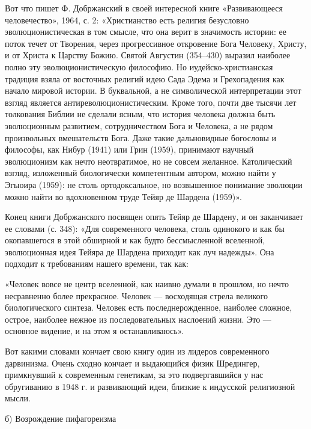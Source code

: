 Вот что пишет  Ф. Добржанский в своей  интересной книге «Развивающееся
человечество»,  1964,  с.  2: «Христианство  есть  религия  безусловно
эволюционистическая в том смысле, что  она верит в значимость истории:
ее  поток  течет  от  Творения, через  прогрессивное  откровение  Бога
Человеку,  Христу,  и  от  Христа к  Царству  Божию.  Святой  Августин
(354--430) выразил  наиболее полно эту  эволюционистическую философию.
Но   иудейско-христианская  традиция   взяла   от  восточных   религий
идею  Сада  Эдема  и  Грехопадения   как  начало  мировой  истории.  В
буквальной,  а не  символической  интерпретации  этот взгляд  является
антиреволюционистическим. Кроме того, почти  две тысячи лет толкования
Библии не сделали ясным, что история человека должна быть эволюционным
развитием, сотрудничеством  Бога и  Человека, а не  рядом произвольных
вмешательств Бога.  Даже такие дальновидные богословы  и философы, как
Нибур (1941) или Грин (1959), принимают научный эволюционизм как нечто
неотвратимое, но  не совсем желанное. Католический  взгляд, изложенный
биологически компетентным  автором, можно  найти у Эгыоира  (1959): не
столь ортодоксальное, но возвышенное понимание эволюции можно найти во
вдохновенном труде Тейяр де Шардена (1959)».

Конец  книги  Добржанского  посвящен  опять Тейяр  де  Шардену,  и  он
заканчивает  ее словами  (с. 348):  «Для современного  человека, столь
одинокого  и  как  бы  окопавшегося   в  этой  обширной  и  как  будто
бессмысленной вселенной, эволюционная идея  Тейяра де Шардена приходит
как луч надежды». Она подходит к требованиям нашего времени, так как:

«Человек вовсе  не центр  вселенной, как наивно  думали в  прошлом, но
нечто  несравненно более  прекрасное.  Человек  --- восходящая  стрела
великого  биологического  синтеза.   Человек  есть  последнерожденное,
наиболее   сложное,  острое,   наиболее  нежное   из  последовательных
наслоений   жизни.   Это  ---   основное   видение,   и  на   этом   я
останавливаюсь».

Вот какими  словами кончает  свою книгу  один из  лидеров современного
дарвинизма.  Очень  сходно  кончает   и  выдающийся  физик  Шредингер,
примкнувший  к  современным генетикам,  за  это  подвергавшийся у  нас
обругиванию  в  1948  г.  и  развивающий  идеи,  близкие  к  индусской
религиозной мысли.

б) Возрождение пифагореизма

